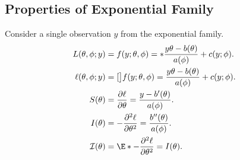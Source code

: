 \documentclass[oneside]{book}\usepackage[]{graphicx}\usepackage[svgnames]{xcolor}
\let\exp\relax%
\let\log\relax%
\begin{document}
\subsection*{Properties of Exponential Family}
Consider a single observation $y$ from the exponential family.
\begin{align*}
      L(\theta,\phi;y)    & =f(y;\theta,\phi)=\exp*{\frac{y\theta-b(\theta)}{a(\phi)}+c(y;\phi)}.      \\
      \ell(\theta,\phi;y) & =\log[\big]{f(y;\theta,\phi)}=\frac{y\theta-b(\theta)}{a(\phi)}+c(y;\phi). \\
      S(\theta)           & =\pdv{\ell}{\theta}=\frac{y-b^\prime(\theta)}{a(\phi)}.                    \\
      I(\theta)           & =-\pdv[order=2]{\ell}{\theta}=\frac{b^{\prime\prime}(\theta)}{a(\phi)}.    \\
      \mathcal{I}(\theta) & =\E*{-\pdv[order=2]{\ell}{\theta}}=I(\theta).
\end{align*}
\end{document}
